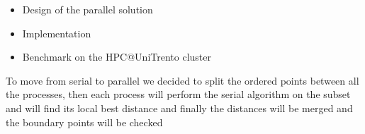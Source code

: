 \begin{itemize}
  \item Design of the parallel solution
  \item Implementation
  \item Benchmark on the HPC@UniTrento cluster
\end{itemize}

To move from serial to parallel we decided to split the ordered 
points between all the processes, then each process will perform 
the serial algorithm on the subset and will find its local best distance and 
finally the distances will be merged and the boundary points will be checked
